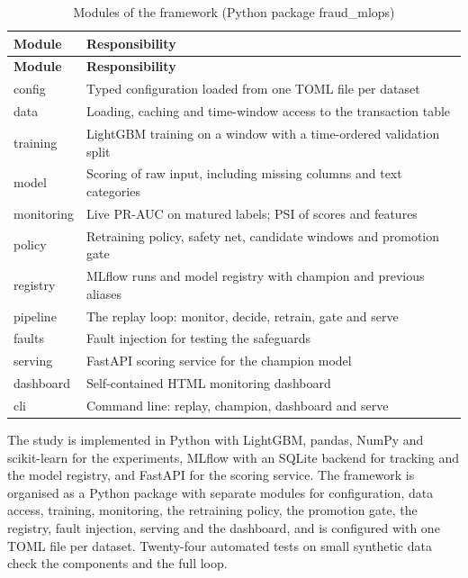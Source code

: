 {\footnotesize
\begin{longtable}{>{\raggedright\arraybackslash}p{}>{\raggedright\arraybackslash}p{}}
\caption{Modules of the framework (Python package fraud\_mlops)}\label{tab:modules}\\
\toprule
\textbf{Module} & \textbf{Responsibility} \\
\midrule
\endfirsthead
\toprule
\textbf{Module} & \textbf{Responsibility} \\
\midrule
\endhead
config & Typed configuration loaded from one TOML file per dataset \\ \midrule
data & Loading, caching and time-window access to the transaction table \\ \midrule
training & LightGBM training on a window with a time-ordered validation split \\ \midrule
model & Scoring of raw input, including missing columns and text categories \\ \midrule
monitoring & Live PR-AUC on matured labels; PSI of scores and features \\ \midrule
policy & Retraining policy, safety net, candidate windows and promotion gate \\ \midrule
registry & MLflow runs and model registry with champion and previous aliases \\ \midrule
pipeline & The replay loop: monitor, decide, retrain, gate and serve \\ \midrule
faults & Fault injection for testing the safeguards \\ \midrule
serving & FastAPI scoring service for the champion model \\ \midrule
dashboard & Self-contained HTML monitoring dashboard \\ \midrule
cli & Command line: replay, champion, dashboard and serve \\ \bottomrule
\end{longtable}
}

The study is implemented in Python with LightGBM, pandas, NumPy and scikit-learn for the experiments, MLflow with an SQLite backend for tracking and the model registry, and FastAPI for the scoring service. The framework is organised as a Python package with separate modules for configuration, data access, training, monitoring, the retraining policy, the promotion gate, the registry, fault injection, serving and the dashboard, and is configured with one TOML file per dataset. Twenty-four automated tests on small synthetic data check the components and the full loop.

